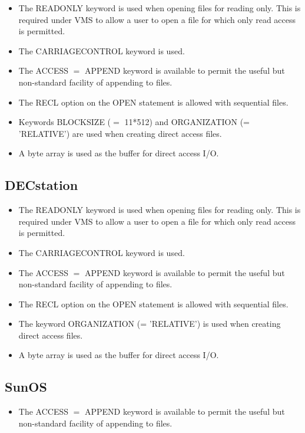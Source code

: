 \begin{itemize}
\item The READONLY keyword is used when opening files for reading only.
This is required under VMS to allow a user to open a file for which
only read access is permitted.
\item The CARRIAGECONTROL keyword is used.
\item The ACCESS $=$ APPEND keyword is available to permit the useful but
non-standard facility of appending to files.
\item The RECL option on the OPEN statement is allowed with sequential files.
\item Keywords BLOCKSIZE ($=$ 11*512) and ORGANIZATION (= 'RELATIVE') are used 
when creating direct access files.
\item A byte array is used as the buffer for direct access I/O.
\end{itemize}

\subsection{DECstation}

\begin{itemize}
\item The READONLY keyword is used when opening files for reading only.
This is required under VMS to allow a user to open a file for which
only read access is permitted.
\item The CARRIAGECONTROL keyword is used.
\item The ACCESS $=$ APPEND keyword is available to permit the useful but
non-standard facility of appending to files.
\item The RECL option on the OPEN statement is allowed with sequential files.
\item The keyword ORGANIZATION (= 'RELATIVE') is used when creating direct
access files.
\item A byte array is used as the buffer for direct access I/O.
\end{itemize}

\subsection{SunOS}

\begin{itemize}
\item The ACCESS $=$ APPEND keyword is available to permit the useful but
non-standard facility of appending to files.
\end{itemize}

